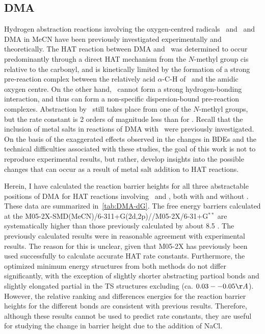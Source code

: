 \subsection{DMA}

Hydrogen abstraction reactions involving the oxygen-centred radicals \bno\ and
\cumo\ and DMA in MeCN have been previously investigated experimentally and
theoretically.\cite{Salamone2013} The HAT reaction between DMA and \bno\ was
determined to occur predominantly through a direct HAT mechanism from the
$N$-methyl group cis relative to the carbonyl, and is kinetically limited by
the formation of a strong pre-reaction complex between the relatively acid
$\alpha$-C-H of \bno\ and the amidic oxygen centre. On the other hand, \cumo\
cannot form a strong hydrogen-bonding interaction, and thus can form a
non-specific dispersion-bound pre-reaction complexes. Abstraction by \cumo\
still takes place from one of the $N$-methyl groups, but the rate constant is 2
orders of magnitude less than for \bno. Recall that the inclusion of metal
salts in reactions of DMA with \cumo\ were previously
investigated.\cite{Salamone2015metals} On the basis of the exaggerated effects
observed in the changes in BDEs and the technical difficulties associated with
these studies, the goal of this work is not to reproduce experimental results,
but rather, develop insights into the possible changes that can occur as a
result of metal salt addition to HAT reactions.

Herein, I have calculated the reaction barrier heights for all three
abstractable positions of DMA for HAT reactions involving \cumo\ and \bno, both
with and without \ch{NaCl}. These data are summarized in~\ref{tab:DMA-dG}. The
free energy barriers calculated at the
M05-2X-SMD(MeCN)/6-311+G(2d,2p)//M05-2X/6-31+G$^{**}$ are systematically higher
than those previously calculated by about 8.5 \kcalmol.\cite{Salamone2013} The
previously calculated results were in reasonable agreement with experimental
results.  The reason for this is unclear, given that M05-2X has previously been
used successfully to calculate accurate HAT rate constants.\cite{Galano2013}
Furthermore, the optimized minimum energy structures from both methods do not
differ significantly, with the exception of slightly shorter abstracting
\ch{C-H} partioal bonds and slightly elongated \ch{O-H} partial in the TS
structures excluding \ch{NaCl} (ca. $0.03--0.05 \AA$).  However, the relative
ranking and differences energies for the reaction barrier heights for the
different \ch{C-H} bonds are consistent with previous results.  Therefore,
although these results cannot be used to predict rate constants, they are
useful for studying the change in barrier height due to the addition of NaCl.

